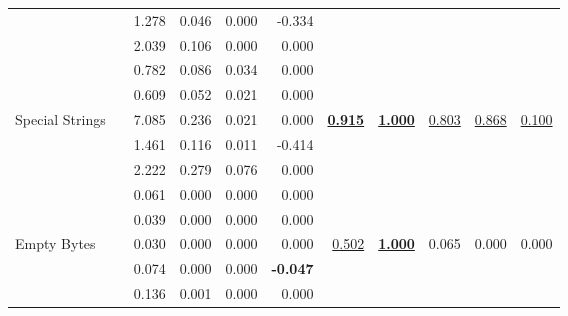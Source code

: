 \begin{tabular}{llrrrrrrrrr}
     & \NAISHT{} & 1.278 & 0.046 & 0.000 & -0.334 &  &  &  &  & \\
     & \GPOT{} & 2.039 & 0.106 & 0.000 & 0.000 &  &  &  &  & \\[.2em]
\rowcolor{row}
     & \TARANTULA{}\rowstrut{} & 0.782 & 0.086 & 0.034 & 0.000 &  &  &  &  & \\
\rowcolor{row}
     & \OCHIAI{} & 0.609 & 0.052 & 0.021 & 0.000 &  &  &  &  & \\
\rowcolor{row}
    Special Strings & \DSTAR{} & 7.085 & 0.236 & 0.021 & 0.000 & \textbf{\color{deepblue}\underline{0.915}} & \textbf{\color{deepblue}\underline{1.000}} & \underline{0.803} & \underline{0.868} & \underline{0.100}\\
\rowcolor{row}
     & \NAISHT{} & 1.461 & 0.116 & 0.011 & -0.414 &  &  &  &  & \\
\rowcolor{row}
     & \GPOT{} & 2.222 & 0.279 & 0.076 & 0.000 &  &  &  &  & \\[.2em]
     & \TARANTULA{}\rowstrut{} & 0.061 & 0.000 & 0.000 & 0.000 &  &  &  &  & \\
     & \OCHIAI{} & 0.039 & 0.000 & 0.000 & 0.000 &  &  &  &  & \\
    Empty Bytes & \DSTAR{} & 0.030 & 0.000 & 0.000 & 0.000 & \underline{0.502} & \textbf{\color{deepblue}\underline{1.000}} & 0.065 & 0.000 & 0.000\\
     & \NAISHT{} & 0.074 & 0.000 & 0.000 & \textbf{\color{deepblue}-0.047} &  &  &  &  & \\
     & \GPOT{} & 0.136 & 0.001 & 0.000 & 0.000 &  &  &  &  & \\[.2em]
\bottomrule
\end{tabular}
